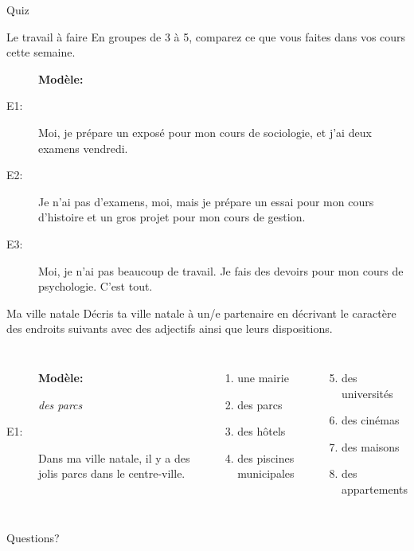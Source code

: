 \documentclass{beamer}
\begin{document}
  \begin{frame}{}
    \begin{center}
      \Large Quiz
    \end{center}
  \end{frame}

  \begin{frame}{Le travail à faire}
    En groupes de 3 à 5, comparez ce que vous faites dans vos cours cette semaine. \\
    \begin{description}
      \item[] \textbf{Modèle:}
      \item[E1:] Moi, je prépare un exposé pour mon cours de sociologie, et j'ai deux examens vendredi.
      \item[E2:] Je n'ai pas d'examens, moi, mais je prépare un essai pour mon cours d'histoire et un gros projet pour mon cours de gestion.
      \item[E3:] Moi, je n'ai pas beaucoup de travail. Je fais des devoirs pour mon cours de psychologie. C'est tout.
    \end{description}
  \end{frame}

  \begin{frame}{Ma ville natale}
    Décris ta ville natale à un/e partenaire en décrivant le caractère des endroits suivants avec des adjectifs ainsi que leurs dispositions. \\
    \vspace{0.25cm}
    \begin{columns}[t]
        \begin{description}
          \item[] \textbf{Modèle:}
          \item[] \emph{des parcs}
          \item[E1:] Dans ma ville natale, il y a des jolis parcs dans le centre-ville.
        \end{description}
        \begin{enumerate}
          \item une mairie
          \item des parcs
          \item des hôtels
          \item des piscines municipales
        \end{enumerate}
        \begin{enumerate}
          \setcounter{enumi}{4}
          \item des universités
          \item des cinémas
          \item des maisons
          \item des appartements
        \end{enumerate}
    \end{columns}
  \end{frame}

  \begin{frame}{}
    \begin{center}
      \Large Questions?
    \end{center}
  \end{frame}
\end{document}
